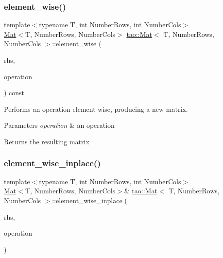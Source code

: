 \subsubsection{\texorpdfstring{element\_wise()}{element\_wise()}}
{\footnotesize\ttfamily template$<$typename T, int Number\+Rows, int Number\+Cols$>$ \\
\mbox{\hyperlink{classtao_1_1_mat}{Mat}}$<$T, Number\+Rows, Number\+Cols$>$ \mbox{\hyperlink{classtao_1_1_mat}{tao\+::\+Mat}}$<$ T, Number\+Rows, Number\+Cols $>$\+::element\+\_\+wise (\begin{DoxyParamCaption}\item[{const \mbox{\hyperlink{classtao_1_1_mat}{Mat}}$<$ T, Number\+Rows, Number\+Cols $>$ \&}]{rhs,  }\item[{std\+::function$<$ T(T, T)$>$}]{operation }\end{DoxyParamCaption}) const\hspace{0.3cm}{\ttfamily [inline]}}



Performs an operation element-\/wise, producing a new matrix. 


\begin{DoxyParams}{Parameters}
{\em operation} & an operation \\
\hline
\end{DoxyParams}
\begin{DoxyReturn}{Returns}
the resulting matrix 
\end{DoxyReturn}
\mbox{\label{classtao_1_1_mat_a4e0897f4d469def2d611be92f4b5d197}} 
\subsubsection{\texorpdfstring{element\_wise\_inplace()}{element\_wise\_inplace()}}
{\footnotesize\ttfamily template$<$typename T, int Number\+Rows, int Number\+Cols$>$ \\
\mbox{\hyperlink{classtao_1_1_mat}{Mat}}$<$T, Number\+Rows, Number\+Cols$>$\& \mbox{\hyperlink{classtao_1_1_mat}{tao\+::\+Mat}}$<$ T, Number\+Rows, Number\+Cols $>$\+::element\+\_\+wise\+\_\+inplace (\begin{DoxyParamCaption}\item[{const \mbox{\hyperlink{classtao_1_1_mat}{Mat}}$<$ T, Number\+Rows, Number\+Cols $>$ \&}]{rhs,  }\item[{std\+::function$<$ T(T, T)$>$}]{operation }\end{DoxyParamCaption})\hspace{0.3cm}{\ttfamily [inline]}}



